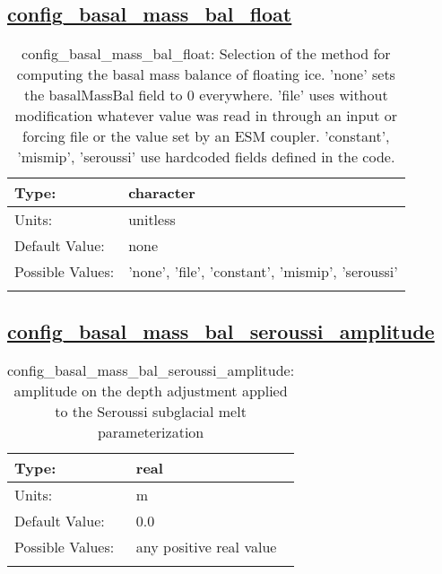 \subsection[config\_basal\_mass\_bal\_float]{\hyperref[sec:nm_tab_thermal_solver]{config\_basal\_mass\_bal\_float}}
\label{subsec:nm_sec_config_basal_mass_bal_float}
\begin{center}
\begin{longtable}{| p{2.0in} || p{4.0in} |}
    \hline
    Type: & character \\
    \hline
    Units: & \si{unitless} \\
    \hline
    Default Value: & none \\
    \hline
    Possible Values: & 'none', 'file', 'constant', 'mismip', 'seroussi' \\
    \hline
    \caption{config\_basal\_mass\_bal\_float: Selection of the method for computing the basal mass balance of floating ice.  'none' sets the basalMassBal field to 0 everywhere.  'file' uses without modification whatever value was read in through an input or forcing file or the value set by an ESM coupler.  'constant', 'mismip', 'seroussi' use hardcoded fields defined in the code.}
\end{longtable}
\end{center}
\subsection[config\_basal\_mass\_bal\_seroussi\_amplitude]{\hyperref[sec:nm_tab_thermal_solver]{config\_basal\_mass\_bal\_seroussi\_amplitude}}
\label{subsec:nm_sec_config_basal_mass_bal_seroussi_amplitude}
\begin{center}
\begin{longtable}{| p{2.0in} || p{4.0in} |}
    \hline
    Type: & real \\
    \hline
    Units: & \si{m} \\
    \hline
    Default Value: & 0.0 \\
    \hline
    Possible Values: & any positive real value \\
    \hline
    \caption{config\_basal\_mass\_bal\_seroussi\_amplitude: amplitude on the depth adjustment applied to the Seroussi subglacial melt parameterization}
\end{longtable}
\end{center}
